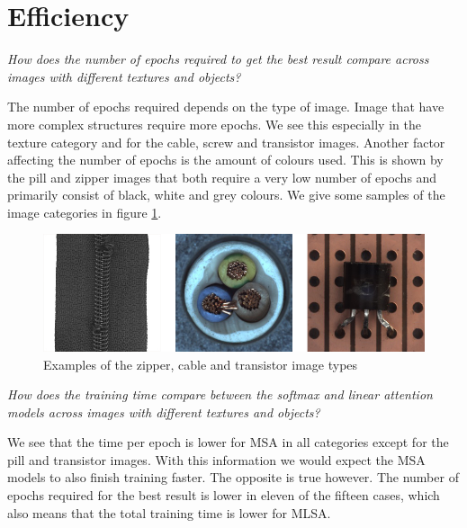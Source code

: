 \section{Efficiency}
\label{sec:results:efficiency}

\textsl{How does the number of epochs required to get the best result compare across images with different textures and objects?}\

The number of epochs required depends on the type of image. Image that have more complex structures require more epochs. We see this especially in the texture category and for the cable, screw and transistor images. Another factor affecting the number of epochs is the amount of colours used. This is shown by the pill and zipper images that both require a very low number of epochs and primarily consist of black, white and grey colours. We give some samples of the image categories in figure \ref{fig:results:detail-samples}.

\begin{figure}[ht!]
\centering
\includegraphics[width=\textwidth]{imgs/samples/image-detail-sample.jpg}
\caption{Examples of the zipper, cable and transistor image types}
\label{fig:results:detail-samples}
\end{figure}

\textsl{How does the training time compare between the softmax and linear attention models across images with different textures and objects?}\

We see that the time per epoch is lower for MSA in all categories except for the pill and transistor images. With this information we would expect the MSA models to also finish training faster. The opposite is true however. The number of epochs required for the best result is lower in eleven of the fifteen cases, which also means that the total training time is lower for MLSA.

